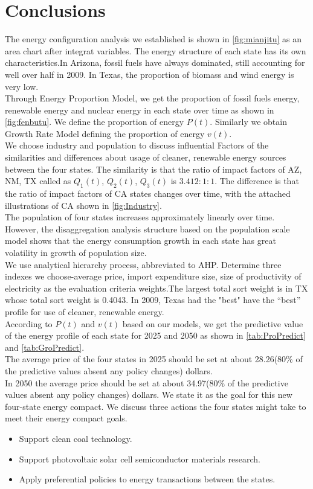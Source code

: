 \documentclass{mcmthesis}
\begin{document}
\section{Conclusions}
The energy configuration analysis we established is shown in \autoref{fig:mianjitu} as an area chart after integrat variables. The energy structure of each state has its own characteristics.In Arizona, fossil fuels have always dominated, still accounting for well over half in 2009. In Texas, the proportion of biomass and wind energy is very low.\\
Through Energy Proportion Model, we get the proportion of fossil fuels
energy, renewable energy and nuclear energy in each state over time as shown in \autoref{fig:fenbutu}.
We define the proportion of energy $ P(t) $. Similarly we obtain Growth Rate Model defining the proportion of energy  $ v(t) $.\\We choose industry and  population to discuss influential Factors of the similarities and differences about usage of cleaner, renewable energy sources between the four states. The similarity is that the ratio of impact factors of AZ, NM, TX called as $ Q_{1}(t) $, $ Q_{2}(t) $, $ Q_{3}(t) $ is $ 3.412:1:1 $.
The difference is that the ratio of impact factors of CA states changes over time, with the attached illustrations of CA shown in \autoref{fig:Industry}.\\
The population of four states increases approximately linearly over time. However, the disaggregation analysis structure based on the population scale model shows that the energy consumption growth in each state has great volatility in growth of population size.\\
We use analytical hierarchy process, abbreviated to AHP. Determine three indexes we choose-average price, import expenditure size, size of productivity of electricity as the evaluation criteria weights.The largest total sort weight is in TX whose total sort weight is 0.4043. In 2009, Texas had the "best" have the “best” profile for use of cleaner, renewable energy.\\
According to $ P(t) $ and  $ v(t) $ based on our models, we get the predictive value of the energy profile of each state for 2025 and 2050 as shown in \autoref{tab:ProPredict} and \autoref{tab:GroPredict}.\\
The average price of the four states in 2025 should be set at about 28.26(80\% of the predictive values absent any policy changes) dollars.\\
In 2050 the average price should be set at about 34.97(80\% of the predictive values absent any policy changes) dollars. We state it as the goal for this new four-state energy compact.
We discuss three actions the four states might take to meet their energy
compact goals.
\begin{itemize}
	\item Support clean coal technology.
	\item Support photovoltaic solar cell semiconductor materials research.
	\item Apply preferential policies to energy transactions between the states.
\end{itemize}
\end{document}
